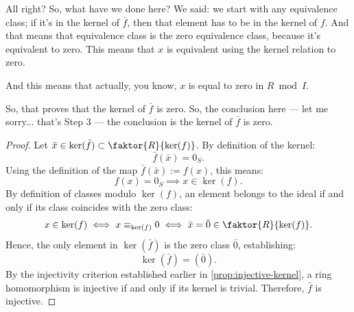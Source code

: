 \begin{proofWrapper}
\begin{speech}[01:04:17 - 01:06:42]
All right? So, what have we done here? We said: we start with any equivalence class; if it's in the kernel of $\bar{f}$, then that element has to be in the kernel of $f$. And that means that equivalence class is the zero equivalence class, because it's equivalent to zero. This means that $x$ is equivalent using the kernel relation to zero.  

And this means that actually, you know, $x$ is equal to zero in $R \bmod I$.  

So, that proves that the kernel of $\bar{f}$ is zero. So, the conclusion here --- let me sorry... that's Step 3 --- the conclusion is the kernel of $\bar{f}$ is zero.
\end{speech}

\begin{content}

\begin{proof}
Let $\bar{x} \in \ker(\bar{f}) \subset \faktor{R}{\ker(f)}$. By definition of the kernel:
\[
\bar{f}(\bar{x}) = 0_S.
\]
Using the definition of the map $\bar{f}(\bar{x}) := f(x)$, this means:
\[
f(x) = 0_S \implies x \in \ker(f).
\]
By definition of classes modulo $\ker(f)$, an element belongs to the ideal if and only if its class coincides with the zero class:
\[
x \in \ker(f) \iff x \equiv_{\ker(f)} 0 \iff \bar{x} = \bar{0} \in \faktor{R}{\ker(f)}.
\]
Hence, the only element in $\ker(\bar{f})$ is the zero class $\bar{0}$, establishing:
\[
\ker(\bar{f}) = (\bar{0}).
\]
By the injectivity criterion established earlier in \cref{prop:injective-kernel}, a ring homomorphism is injective if and only if its kernel is trivial. Therefore, $\bar{f}$ is injective.
\end{proof}


\end{content}
\end{proofWrapper}
